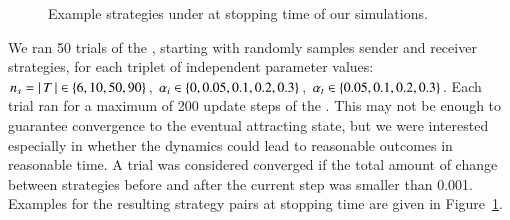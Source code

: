 \begin{figure}
  \caption{Example strategies under \rdd at stopping time of our simulations.}
  \label{fig:example_strats}
\end{figure}

We ran 50 trials of the \rdd, starting with randomly samples sender
and receiver strategies, for each triplet of independent parameter
values: $n_s = \left \lvert \, T \, \right\rvert \in \left\{6, 10, 50, 90\right\}$, $\alpha_i \in
\left\{0, 0.05, 0.1, 0.2, 0.3\right\}$, $\alpha_t \in \left\{0.05, 0.1, 0.2,
  0.3\right\}$. Each trial ran for a maximum of 200 update steps of the
\rdd. This may not be enough to guarantee convergence to the eventual
attracting state, but we were interested especially in whether the
dynamics could lead to reasonable outcomes in reasonable time. A trial
was considered converged if the total amount of change between
strategies before and after the current \rdd step was smaller than
0.001. Examples for the resulting strategy pairs at stopping time are
given in Figure~\ref{fig:example_strats}.


